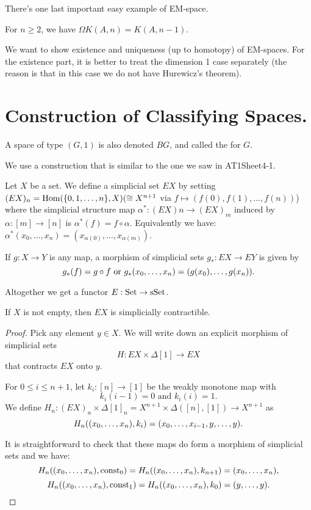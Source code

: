 

There's one last important easy example of EM-space.

\begin{example}
For $n\geq2$, we have $\Omega K(A,n)=K(A,n-1)$.
\end{example}

We want to show existence and uniqueness (up to homotopy) of EM-spaces. For the existence part, it is better to treat the dimension 1 case separately (the reason is that in this case we do not have Hurewicz's theorem).

\section{Construction of Classifying Spaces.}

A space of type $(G,1)$ is also denoted $BG$, and called the  for $G$.

We use a construction that is similar to the one we saw in AT1Sheet4-1.

\begin{construction}
Let $X$ be a set. We define a simplicial set $EX$ by setting $(EX)_n=\operatorname{Hom}(\{0,1,\dots,n\},X)(\cong X^{n+1}$ via $f\mapsto(f(0),f(1),\dots,f(n))$) where the simplicial structure map $\alpha^*:(EX)n\to(EX)_m$ induced by $\alpha:[m]\to[n]$ is $\alpha^*(f)=f\circ\alpha$. Equivalently we have: $\alpha^*(x_0,\dots,x_n)=(x_{\alpha(0)},\dots,x_{\alpha(m)})$.

If $g:X\to Y$ is any map, a morphism of simplicial sets $g_*:EX\to EY$ is given by
\[g_*(f)=g\circ f\text{ or }g_*({x_0,\dots,x_n})=(g(x_0),\dots,g(x_n)).\]

Altogether we get a functor $E:{\mathrm{Set}}\to{\mathrm{sSet}}$.
\end{construction}

\begin{proposition}
If $X$ is not empty, then $EX$ is simplicially contractible.
\end{proposition}

\begin{proof}
Pick any element $y\in X$. We will write down an explicit morphism of simplicial sets
\[H:EX\times\Delta[1]\to EX\]
that contracts $EX$ onto $y$.

For $0 \le i \le n+1$, let $k_i:[n]\to[1]$ be the weakly monotone map with
\[k_i(i-1)=0\text{ and }k_i(i)=1.\]
We define $H_n:(EX)_n\times\Delta[1]_n=X^{n+1}\times\Delta([n],[1])\to X^{n+1}$ as
\[H_n(({x_0,\dots,x_n}),k_i)=(x_0,\dots,x_{i-1},y,\dots,y).\]

It is straightforward to check that these maps do form a morphism of simplicial sets and we have:
\[H_n(({x_0,\dots,x_n}),\operatorname{const}_0)=H_n(({x_0,\dots,x_n}),k_{n+1})=({x_0,\dots,x_n}),\]
\[H_n(({x_0,\dots,x_n}),\operatorname{const}_1)=H_n(({x_0,\dots,x_n}),k_0)=(y,\dots,y).\]
\end{proof}

